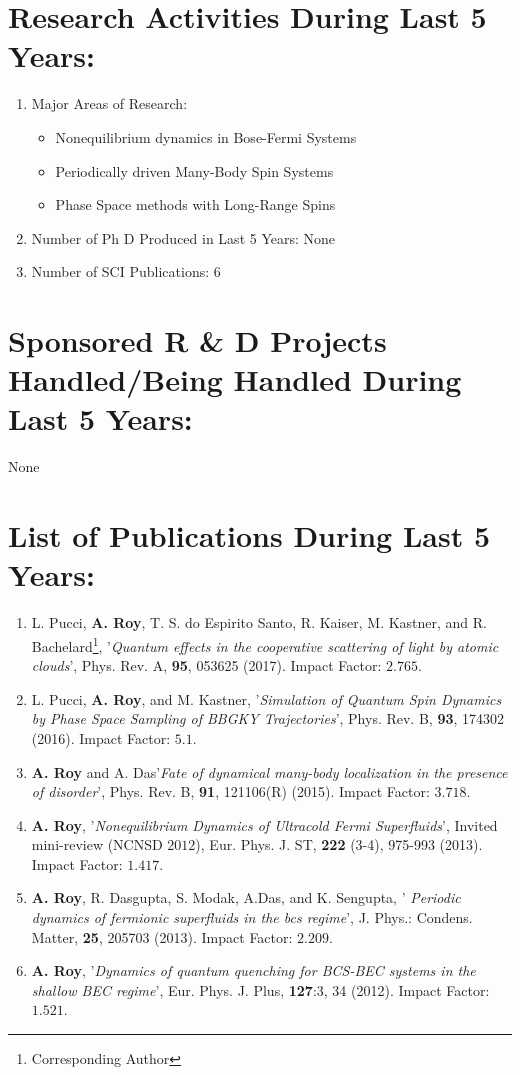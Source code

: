 \documentclass[a4paper,11pt,color]{article}
\begin{document}
\section{Research Activities During Last 5 Years:}
\begin{enumerate}[label=(\alph*)] 
\item 
Major Areas of Research:
\begin{itemize}
\item 
Nonequilibrium dynamics in Bose-Fermi Systems
\item
Periodically driven Many-Body Spin Systems
\item
Phase Space methods with Long-Range Spins
\end{itemize}

\item
Number of Ph D Produced in Last 5 Years: None
\item
Number of SCI Publications: 6
\end{enumerate}

\section{Sponsored R \& D Projects Handled/Being Handled During Last 5 Years:}
None

\section{List of Publications During Last 5 Years: }
\begin{enumerate}[label=(\roman*)] 
\item
L. Pucci, \textbf{A. Roy}, T. S. do Espirito Santo, R. Kaiser, M. Kastner, and R. Bachelard\footnote{\large{Corresponding Author}}, '\textit{Quantum effects in the cooperative scattering of light by atomic clouds}',  Phys. Rev. A, {\bf 95}, 053625 (2017). Impact Factor:  $2.765$.
\item
L. Pucci, \textbf{A. Roy}, and M. Kastner\footnotemark[\value{footnote}], '\textit{Simulation of Quantum Spin Dynamics by Phase Space Sampling of BBGKY Trajectories}', Phys. Rev. B, {\bf 93}, 174302 (2016). Impact Factor: $5.1$.
\item
\textbf{A. Roy} and A. Das\footnotemark[\value{footnote}] '\textit{Fate of dynamical many-body localization in the presence of disorder}', Phys. Rev. B, {\bf 91}, 121106(R) (2015). Impact Factor: $3.718$.
\item
\textbf{A. Roy}\footnotemark[\value{footnote}], '\textit{Nonequilibrium Dynamics of Ultracold Fermi Superfluids}', Invited mini-review (NCNSD $2012$),
Eur. Phys. J. ST, {\bf 222} (3-4), 975-993 (2013). Impact Factor: $1.417$.
\item
\textbf{A. Roy}\footnotemark[\value{footnote}] , R. Dasgupta, S. Modak, A.Das, and K. Sengupta, '\textit{ Periodic dynamics of fermionic superfluids in the bcs regime}',  J. Phys.: Condens. Matter, {\bf 25}, 205703 (2013). Impact Factor: $2.209$.
\item
\textbf{A. Roy}\footnotemark[\value{footnote}] , '\textit{Dynamics of quantum quenching for BCS-BEC systems in the shallow BEC regime}', Eur. Phys. J. {Plus}, {\bf 127}:3, 34 (2012). Impact Factor: $1.521$.
\end{enumerate}
\end{document}
